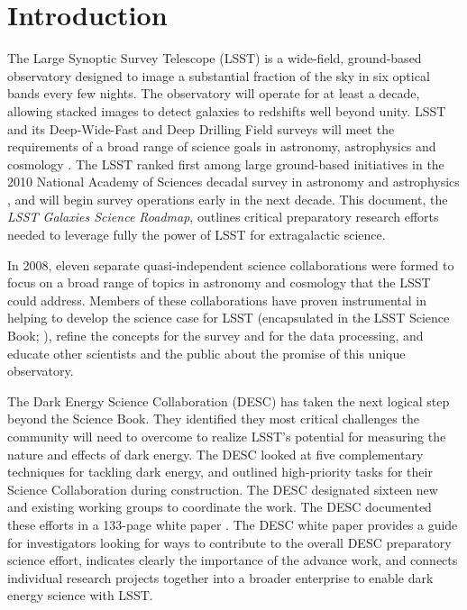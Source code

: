 
\chapter[Introduction]{Introduction}
\label{ch:intro}

{\justify
The Large Synoptic Survey Telescope (LSST) is a wide-field, ground-based
observatory designed to image a substantial fraction of the sky in six optical
bands every few nights. 
The observatory will operate for at least a decade, allowing 
stacked images to detect galaxies to redshifts well beyond unity. LSST and
its Deep-Wide-Fast and Deep Drilling Field surveys will meet 
the requirements of a broad range of science goals in astronomy, astrophysics and cosmology
\citep{ivezic2008a}. 
The LSST ranked first among large ground-based initiatives in the
2010 National Academy of Sciences decadal survey in astronomy and astrophysics \citep{nrc2010a},
and will begin survey operations early in the next decade.
This document, the {\it LSST Galaxies Science Roadmap}, outlines critical preparatory research efforts needed 
to leverage fully the power of LSST for extragalactic science. 

In 2008, eleven separate quasi-independent science collaborations were formed to
focus on a broad range of topics in astronomy and cosmology that the LSST could
address. Members of these collaborations have proven instrumental in helping to
develop the science case for LSST (encapsulated in the LSST Science Book;
\citealt{LSSTSciBook}), 
refine the concepts for the survey and for the data processing, and educate
other scientists and the public about the promise of this unique observatory.

The Dark Energy Science Collaboration (DESC) has taken the
next logical step beyond the Science Book. They identified they most critical
challenges the community will need to overcome
to realize LSST’s potential for
measuring the nature and effects of dark energy. The
DESC looked at five complementary
techniques for tackling dark energy, and outlined high-priority tasks for their
Science Collaboration during construction. The DESC designated sixteen 
new and existing working
groups to coordinate the work. The DESC documented these efforts
in a 133-page white paper \citep{LSSTDESC}. The DESC white
paper provides a guide for investigators looking for ways to contribute to the
overall DESC preparatory science effort, 
indicates clearly the importance of the advance work, and 
connects individual research projects together into a broader 
enterprise to enable dark energy science with LSST.

}
